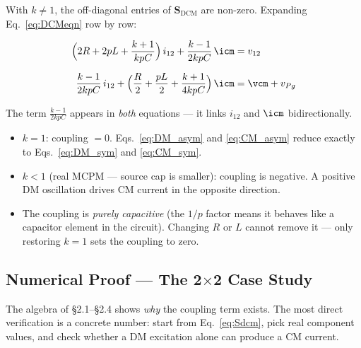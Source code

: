 With $k \neq 1$, the off-diagonal entries of $\mathbf{S}_{\mathrm{DCM}}$
are non-zero.  Expanding Eq.~\eqref{eq:DCMeqn} row by row:

\begin{eqnbox}[Asymmetric Coupled Equations ($N = 2$)]
\begin{align}
    \Bigl(2R + 2pL + \frac{k+1}{kpC}\Bigr)\,i_{12}
    + \frac{k-1}{2kpC}\,\icm
        &= v_{12}
        \label{eq:DM_asym} \\[6pt]
    \frac{k-1}{2kpC}\,i_{12}
    + \Bigl(\frac{R}{2} + \frac{pL}{2} + \frac{k+1}{4kpC}\Bigr)\,\icm
        &= \vcm + v_{Pg}
        \label{eq:CM_asym}
\end{align}
\end{eqnbox}

The term $\tfrac{k-1}{2kpC}$ appears in \emph{both} equations —
it links $i_{12}$ and $\icm$ bidirectionally.

\begin{warningbox}
\begin{itemize}
    \item $k = 1$: coupling $= 0$.  Eqs.~\eqref{eq:DM_asym} and
          \eqref{eq:CM_asym} reduce exactly to
          Eqs.~\eqref{eq:DM_sym} and \eqref{eq:CM_sym}. \checkmark
    \item $k < 1$ (real MCPM — source cap is smaller):
          coupling is negative.  A positive DM oscillation drives
          CM current in the opposite direction.
    \item The coupling is \emph{purely capacitive} (the $1/p$ factor
          means it behaves like a capacitor element in the circuit).
          Changing $R$ or $L$ cannot remove it — only restoring
          $k = 1$ sets the coupling to zero.
\end{itemize}
\end{warningbox}

\subsection{Numerical Proof — The 2\texorpdfstring{$\times$}{×}2
            Case Study}

The algebra of \S2.1--\S2.4 shows \emph{why} the coupling term exists.
The most direct verification is a concrete number: start from
Eq.~\eqref{eq:Sdcm}, pick real component values, and check whether
a DM excitation alone can produce a CM current.


